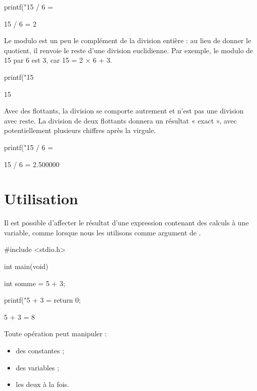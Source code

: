 \begin{C}
printf("15 / 6 = %
\end{C}

\begin{C}
15 / 6 = 2
\end{C}

Le modulo est un peu le complément de la division entière : au lieu de
donner le quotient, il renvoie le reste d'une division euclidienne. Par
exemple, le modulo de 15 par 6 est 3, car 15 = 2 × 6 + 3.

\begin{C}
printf("15 %
\end{C}

\begin{C}
15 %
\end{C}

Avec des flottants, la division se comporte autrement et n'est pas une
division avec reste. La division de deux flottants donnera un résultat «
exact », avec potentiellement plusieurs chiffres après la virgule.

\begin{C}
printf("15 / 6 = %
\end{C}

\begin{C}
15 / 6 = 2.500000
\end{C}

\section{Utilisation}
\label{utilisation}

Il est possible d'affecter le résultat d'une expression contenant des
calculs à une variable, comme lorsque nous les utilisons comme argument
de .

\begin{C}
#include <stdio.h>

int main(void)
{
    int somme = 5 + 3;

    printf("5 + 3 = %
    return 0;
}
\end{C}

\begin{C}
5 + 3 = 8
\end{C}

Toute opération peut manipuler :

\begin{itemize}
\item
  des constantes ;
\item
  des variables ;
\item
  les deux à la fois.
\end{itemize}


